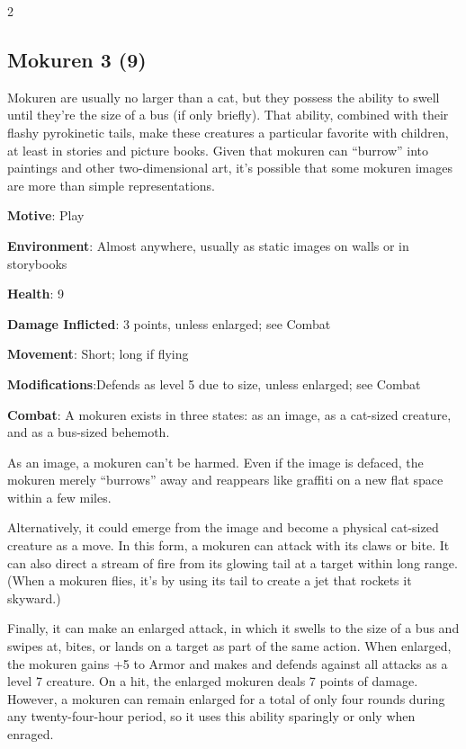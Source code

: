 \begin{multicols}{2}
\subsection{Mokuren	3 (9)}

Mokuren are usually no larger than a cat, but they possess the ability to swell until they’re the size of a bus (if only briefly). That ability, combined with their flashy pyrokinetic tails, make these creatures a particular favorite with children, at least in stories and picture books. Given that mokuren can “burrow” into paintings and other two-dimensional art, it’s possible that some mokuren images are more than simple representations.

\textbf{Motive}: Play

\textbf{Environment}: Almost anywhere, usually as static images on walls or in storybooks

\textbf{Health}: 9

\textbf{Damage Inflicted}: 3 points, unless enlarged; see Combat

\textbf{Movement}: Short; long if flying

\textbf{Modifications}:Defends as level 5 due to size, unless enlarged; see Combat

\textbf{Combat}: A mokuren exists in three states: as an image, as a cat-sized creature, and as a bus-sized behemoth.

As an image, a mokuren can’t be harmed. Even if the image is defaced, the mokuren merely “burrows” away and reappears like graffiti on a new flat space within a few miles.

Alternatively, it could emerge from the image and become a physical cat-sized creature as a move. In this form, a mokuren can attack with its claws or bite. It can also direct a stream of fire from its glowing tail at a target within long range. (When a mokuren flies, it’s by using its tail to create a jet that rockets it skyward.)

Finally, it can make an enlarged attack, in which it swells to the size of a bus and swipes at, bites, or lands on a target as part of the same action. When enlarged, the mokuren gains +5 to Armor and makes and defends against all attacks as a level 7 creature. On a hit, the enlarged mokuren deals 7 points of damage. However, a mokuren can remain enlarged for a total of only four rounds during any twenty-four-hour period, so it uses this ability sparingly or only when enraged.


\end{multicols}
